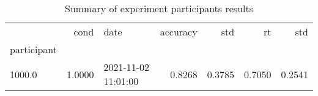 \begin{table}
\centering
\caption{Summary of experiment participants results}
\label{table-subject-summary}
\begin{tabular}{lrlrrrr}
\toprule
{} &   cond &                 date & accuracy &    std &     rt &    std \\
participant &        &                      &          &        &        &        \\
\midrule
1000.0      & 1.0000 &  2021-11-02 11:01:00 &   0.8268 & 0.3785 & 0.7050 & 0.2541 \\
\bottomrule
\end{tabular}
\end{table}
